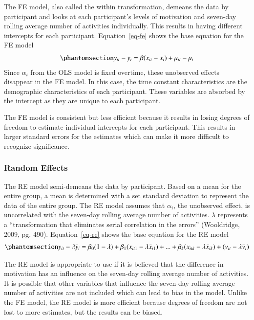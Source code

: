 \documentclass[
  letterpaper,
  number,
  review,
  3p]{elsarticle}
\begin{document}
The FE model, also called the within transformation, demeans the data by
participant and looks at each participant's levels of motivation and
seven-day rolling average number of activities individually. This
results in having different intercepts for each participant.
Equation~\ref{eq-fe} shows the base equation for the FE model
\begin{equation}\phantomsection\label{eq-fe}{
y_{it} - \bar{y}_i = \beta ( x_{it} - \bar{x}_i ) + \mu_{it} -\bar{\mu}_i 
}\end{equation} Since \(\alpha_i\) from the OLS model is fixed overtime,
these unobserved effects disappear in the FE model. In this case, the
time constant characteristics are the demographic characteristics of
each participant. These variables are absorbed by the intercept as they
are unique to each participant.

The FE model is consistent but less efficient because it results in
losing degrees of freedom to estimate individual intercepts for each
participant. This results in larger standard errors for the estimates
which can make it more difficult to recognize significance.

\subsubsection{Random Effects}\label{random-effects}

The RE model semi-demeans the data by participant. Based on a mean for
the entire group, a mean is determined with a set standard deviation to
represent the data of the entire group. The RE model assumes that
\(\alpha_i\), the unobserved effect, is uncorrelated with the seven-day
rolling average number of activities. \(\lambda\) represents a
``transformation that eliminates serial correlation in the errors''
(Wooldridge, 2009, pg. 490). Equation~\ref{eq-re} shows the base
equation for the RE model \begin{equation}\phantomsection\label{eq-re}{ 
y_{it}-\lambda\bar{y}_i = \beta_0(1-\lambda)+\beta_1 ( x_{it1}-\lambda\bar{x}_{i1})+...+\beta_k (x_{itk}-\lambda\bar{x}_{ik})+(\nu_{it}-\lambda\bar{\nu}_i) 
}\end{equation}

\hfill\break
The RE model is appropriate to use if it is believed that the difference
in motivation has an influence on the seven-day rolling average number
of activities. It is possible that other variables that influence the
seven-day rolling average number of activities are not included which
can lead to bias in the model. Unlike the FE model, the RE model is more
efficient because degrees of freedom are not lost to more estimates, but
the results can be biased.
\end{document}

